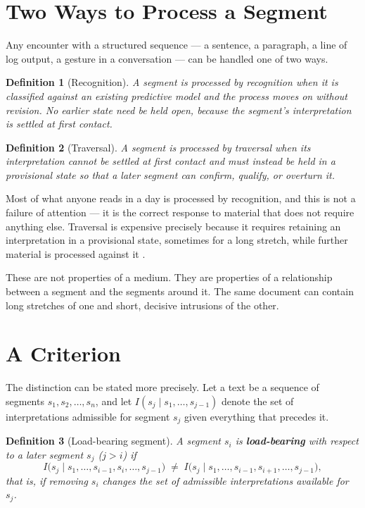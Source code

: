 \documentclass[11pt]{article}
\newtheorem{definition}{Definition}
\begin{document}
\section{Two Ways to Process a Segment}

Any encounter with a structured sequence --- a sentence, a paragraph, a line of log output, a gesture in a conversation --- can be handled one of two ways.

\begin{definition}[Recognition]
A segment is processed by \emph{recognition} when it is classified against an existing predictive model and the process moves on without revision. No earlier state need be held open, because the segment's interpretation is settled at first contact.
\end{definition}

\begin{definition}[Traversal]
A segment is processed by \emph{traversal} when its interpretation cannot be settled at first contact and must instead be held in a provisional state so that a later segment can confirm, qualify, or overturn it.
\end{definition}

Most of what anyone reads in a day is processed by recognition, and this is not a failure of attention --- it is the correct response to material that does not require anything else. Traversal is expensive precisely because it requires retaining an interpretation in a provisional state, sometimes for a long stretch, while further material is processed against it \citep{kintsch1998,zwaanradvansky1998}.

These are not properties of a medium. They are properties of a relationship between a segment and the segments around it. The same document can contain long stretches of one and short, decisive intrusions of the other.

\section{A Criterion}

The distinction can be stated more precisely. Let a text be a sequence of segments $s_1, s_2, \ldots, s_n$, and let $I(s_j \mid s_1, \ldots, s_{j-1})$ denote the set of interpretations admissible for segment $s_j$ given everything that precedes it.

\begin{definition}[Load-bearing segment]
A segment $s_i$ is \textbf{load-bearing} with respect to a later segment $s_j$ ($j > i$) if
\[
I\bigl(s_j \mid s_1, \ldots, s_{i-1}, s_i, \ldots, s_{j-1}\bigr) \;\neq\; I\bigl(s_j \mid s_1, \ldots, s_{i-1}, s_{i+1}, \ldots, s_{j-1}\bigr),
\]
that is, if removing $s_i$ changes the set of admissible interpretations available for $s_j$.
\end{definition}
\end{document}
